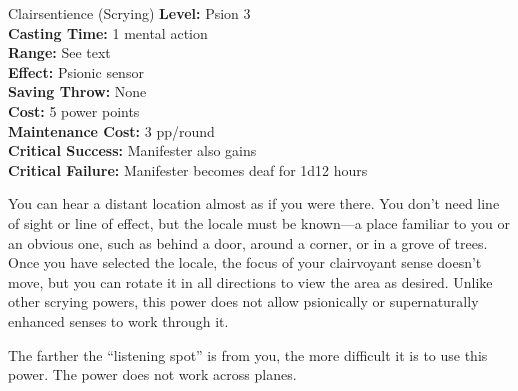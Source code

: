 {Clairsentience (Scrying)}
{
	\textbf{Level:}
	Psion 3\\
	\textbf{Casting Time:}
	1 mental action\\
	\textbf{Range:}
	See text\\
	\textbf{Effect:}
	Psionic sensor\\
	\textbf{Saving Throw:}
	None\\
	\textbf{Cost:}
	5 power points\\
	\textbf{Maintenance Cost:}
	3 pp/round\\
	\textbf{Critical Success:}
	Manifester also gains \\
	\textbf{Critical Failure:}
	Manifester becomes deaf for 1d12 hours\\
}
{
	You can hear a distant location almost as if you were there. You don’t need line of sight or line of effect, but the locale must be known---a place familiar to you or an obvious one, such as behind a door, around a corner, or in a grove of trees. Once you have selected the locale, the focus of your clairvoyant sense doesn’t move, but you can rotate it in all directions to view the area as desired. Unlike other scrying powers, this power does not allow psionically or supernaturally enhanced senses to work through it.

	The farther the ``listening spot'' is from you, the more difficult it is to use this power. The power does not work across planes.

}